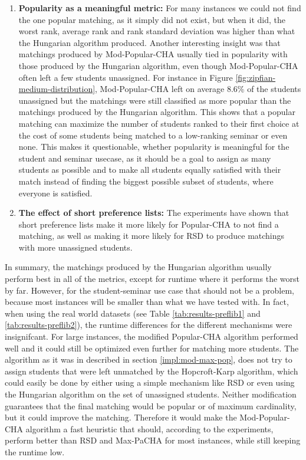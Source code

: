 \begin{enumerate}
  \item \textbf{Popularity as a meaningful metric:} For many instances we could not find the one popular matching, as it simply did not exist, but when it did, the worst rank, average rank and rank standard deviation was higher than what the Hungarian algorithm produced. Another interesting insight was that matchings produced by Mod-Popular-CHA usually tied in popularity with those produced by the Hungarian algorithm, even though Mod-Popular-CHA often left a few students unassigned. For instance in Figure \ref{fig:zipfian-medium-distribution}, Mod-Popular-CHA left on average 8.6\% of the students unassigned but the matchings were still classified as more popular than the matchings produced by the Hungarian algorithm. This shows that a popular matching can maximize the number of students ranked to their first choice at the cost of some students being matched to a low-ranking seminar or even none. This makes it questionable, whether popularity is meaningful for the student and seminar usecase, as it should be a goal to assign as many students as possible and to make all students equally satisfied with their match instead of finding the biggest possible subset of students, where everyone is satisfied.
  \item \textbf{The effect of short preference lists:} The experiments have shown that short preference lists make it more likely for Popular-CHA to not find a matching, as well as making it more likely for RSD to produce matchings with more unassigned students.
\end{enumerate}

In summary, the matchings produced by the Hungarian algorithm usually perform best in all of the metrics, except for runtime where it performs the worst by far. However, for the student-seminar use case that should not be a problem, because most instances will be smaller than what we have tested with. In fact, when using the real world datasets (see Table \ref{tab:results-preflib1} and \ref{tab:results-preflib2}), the runtime differences for the different mechanisms were insignifcant. For large instances, the modified Popular-CHA algorithm performed well and it could still be optimized even further for matching more students. The algorithm as it was in described in section \ref{impl:mod-max-pop}, does not try to assign students that were left unmatched by the Hopcroft-Karp algorithm, which could easily be done by either using a simple mechanism like RSD or even using the Hungarian algorithm on the set of unassigned students. Neither modification guarantees that the final matching would be popular or of maximum cardinality, but it could improve the matching. Therefore it would make the Mod-Popular-CHA algorithm a fast heuristic that should, according to the experiments, perform better than RSD and Max-PaCHA for most instances, while still keeping the runtime low.